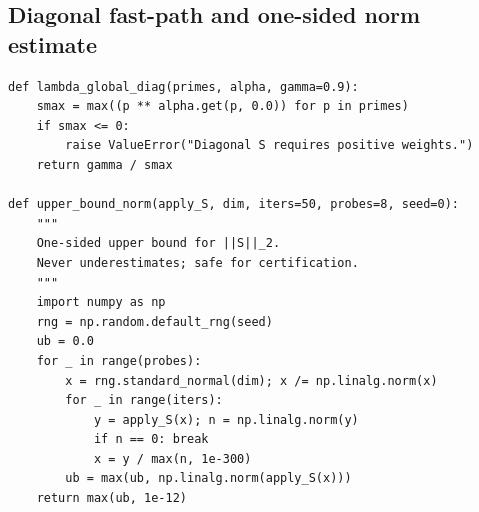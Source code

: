 \documentclass[11pt]{article}
\theoremstyle{definition}
\begin{document}
\subsection{Diagonal fast-path and one-sided norm estimate}
\begin{lstlisting}[style=py,caption={Diagonal fast-path and safe upper-bound on $\|S\|$},label={lst:diagub}]
def lambda_global_diag(primes, alpha, gamma=0.9):
    smax = max((p ** alpha.get(p, 0.0)) for p in primes)
    if smax <= 0:
        raise ValueError("Diagonal S requires positive weights.")
    return gamma / smax

def upper_bound_norm(apply_S, dim, iters=50, probes=8, seed=0):
    """
    One-sided upper bound for ||S||_2.
    Never underestimates; safe for certification.
    """
    import numpy as np
    rng = np.random.default_rng(seed)
    ub = 0.0
    for _ in range(probes):
        x = rng.standard_normal(dim); x /= np.linalg.norm(x)
        for _ in range(iters):
            y = apply_S(x); n = np.linalg.norm(y)
            if n == 0: break
            x = y / max(n, 1e-300)
        ub = max(ub, np.linalg.norm(apply_S(x)))
    return max(ub, 1e-12)
\end{lstlisting}
\end{document}
